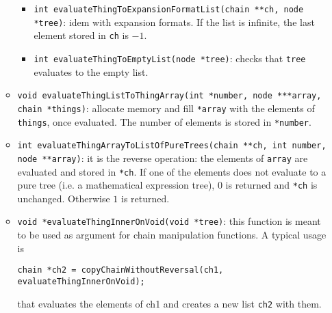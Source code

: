\documentclass{article}
\begin{document}
\begin{itemize}
\begin{itemize}
\begin{itemize}
    \item \texttt{int evaluateThingToExpansionFormatList(chain **ch, node *tree)}: idem with expansion formats. If the list is infinite, the last element stored in \texttt{ch} is $-1$.
    \item \texttt{int evaluateThingToEmptyList(node *tree)}: checks that \texttt{tree} evaluates to the empty list.
    \end{itemize}
  \item \texttt{void evaluateThingListToThingArray(int *number, node ***array, chain *things)}: allocate memory and fill \texttt{*array} with the elements of \texttt{things}, once evaluated. The number of elements is stored in \texttt{*number}.
  \item \texttt{int evaluateThingArrayToListOfPureTrees(chain **ch, int number, node **array)}: it is the reverse operation: the elements of \texttt{array} are evaluated and stored in \texttt{*ch}. If one of the elements does not evaluate to a pure tree (i.e. a mathematical expression tree), $0$ is returned and \texttt{*ch} is unchanged. Otherwise $1$ is returned.
  \item \texttt{void *evaluateThingInnerOnVoid(void *tree)}: this function is meant to be used as argument for chain manipulation functions. A typical usage is
    \begin{center}
      \texttt{chain *ch2 = copyChainWithoutReversal(ch1, evaluateThingInnerOnVoid);}
    \end{center}
that evaluates the elements of ch1 and creates a new list \texttt{ch2} with them.
  \end{itemize}
\end{itemize}




\newpage
\end{document}
